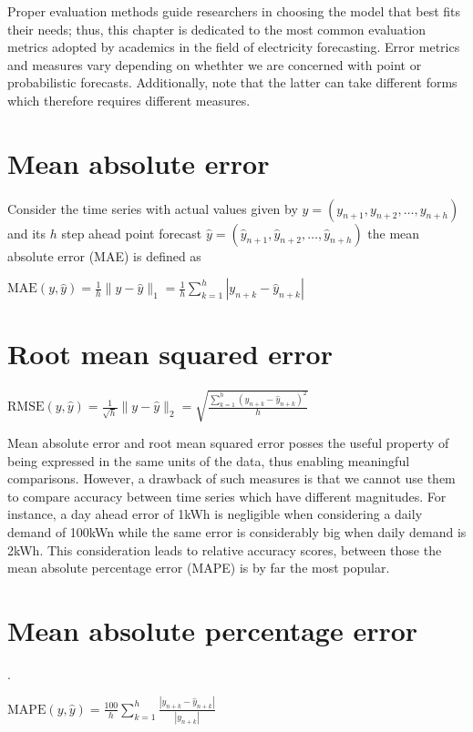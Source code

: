 Proper evaluation methods guide researchers in choosing the model that best fits their needs; thus, this chapter is dedicated to the most common evaluation metrics adopted by academics in the field of electricity forecasting. Error metrics and measures vary depending on whethter we are concerned with point or probabilistic forecasts. Additionally, note that the latter can take different forms which therefore requires different measures.
\section{Mean absolute error}\label{mae}
Consider the time series with actual values given by $y=(y_{n+1}, y_{n+2},\dots, y_{n+h})$
and its $h$ step ahead point forecast $\hat{y}=(\hat{y}_{n+1}, \hat{y}_{n+2},\dots, \hat{y}_{n+h})$ the mean absolute error (MAE) is defined as
\begin{definition}
    $\mathrm{MAE}(y,\hat{y})=\frac{1}{h}\| y- \hat{y}\|_{1}=\frac{1}{h}\sum\limits_{k=1}^{h}|y_{n+k}-\hat{y}_{n+k}|$
\end{definition}

\section{Root mean squared error}\label{rmse}
\begin{definition}
    $\mathrm{RMSE}(y, \hat{y})=\frac{1}{\sqrt{h}}\|y-\hat{y}\|_{2}=\sqrt{\frac{\sum\limits_{k=1}^{h}(y_{n+k}- \hat{y}_{n+k})^2}{h}}$
\end{definition}

Mean absolute error and root mean squared error posses the useful property of being expressed in the same units of the data, thus enabling meaningful comparisons.
However, a drawback of such measures is that we cannot use them to compare accuracy between time series which have different magnitudes. For instance, a day ahead error of 1kWh is negligible when considering a daily demand of 100kWn while the same error is considerably big when daily demand is 2kWh. This consideration leads to relative accuracy scores, between those the mean absolute percentage error (MAPE) is by far the most popular.


\section{Mean absolute percentage error}\label{mape}. 
\begin{definition}
    $\mathrm{MAPE}(y,\hat{y})=\frac{100}{h}\sum\limits_{k=1}^{h}\frac{|y_{n+k}-\hat{y}_{n+k}|}{|y_{n+k}|}$
\end{definition}

